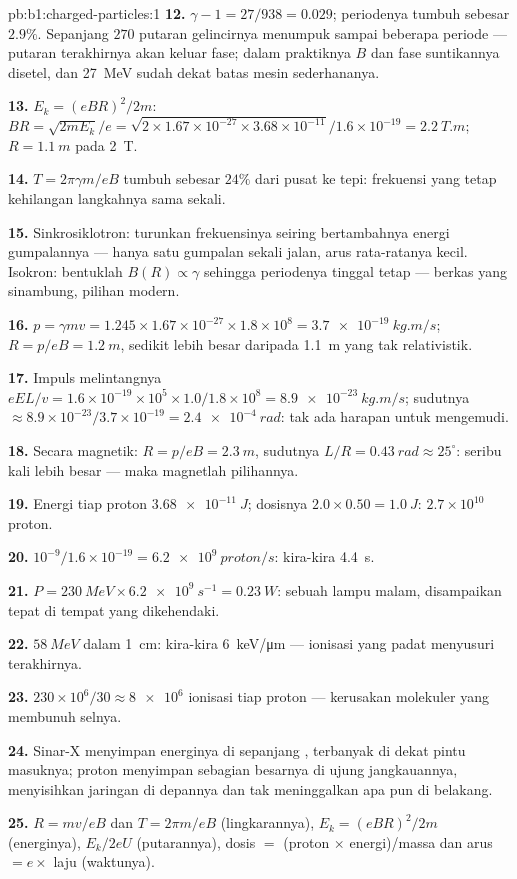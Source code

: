 \begin{solution}{pb:b1:charged-particles:1}
\textbf{12.} $\gamma - 1 = 27/938 = 0.029$; periodenya tumbuh sebesar $2.9\%$.
Sepanjang $270$ putaran gelincirnya menumpuk sampai beberapa periode ---
putaran terakhirnya akan keluar fase; dalam praktiknya $B$ dan fase
suntikannya disetel, dan \qty{27}{MeV} sudah dekat batas mesin sederhananya.

\textbf{13.} $E_k = (eBR)^2/2m$: $BR = \sqrt{2mE_k}/e = \sqrt{2 \times 1.67\times
10^{-27} \times 3.68\times10^{-11}}/1.6\times10^{-19} = \qty{2.2}{T.m}$; $R =
\qty{1.1}{m}$ pada \qty{2}{T}.

\textbf{14.} $T = 2\pi\gamma m/eB$ tumbuh sebesar $24\%$ dari pusat ke tepi:
frekuensi yang tetap kehilangan langkahnya sama sekali.

\textbf{15.} Sinkrosiklotron: turunkan frekuensinya seiring bertambahnya
energi gumpalannya --- hanya satu gumpalan sekali jalan, arus rata-ratanya
kecil. Isokron: bentuklah $B(R) \propto \gamma$ sehingga periodenya tinggal
tetap --- berkas yang sinambung, pilihan modern.

\textbf{16.} $p = \gamma mv = 1.245 \times 1.67\times10^{-27} \times 1.8\times10^8
= \qty{3.7e-19}{kg.m/s}$; $R = p/eB = \qty{1.2}{m}$, sedikit lebih besar daripada
\qty{1.1}{m} yang tak relativistik.

\textbf{17.} Impuls melintangnya $eEL/v = 1.6\times10^{-19} \times 10^5 \times
1.0/1.8\times10^8 = \qty{8.9e-23}{kg.m/s}$; sudutnya $\approx 8.9\times10^{-23}/
3.7\times10^{-19} = \qty{2.4e-4}{rad}$: tak ada harapan untuk mengemudi.

\textbf{18.} Secara magnetik: $R = p/eB = \qty{2.3}{m}$, sudutnya $L/R = \qty{0.43}{rad}
\approx 25^\circ$: seribu kali lebih besar --- maka magnetlah pilihannya.

\textbf{19.} Energi tiap proton $\qty{3.68e-11}{J}$; dosisnya $2.0 \times 0.50 =
\qty{1.0}{J}$: $2.7\times10^{10}$ proton.

\textbf{20.} $10^{-9}/1.6\times10^{-19} = \qty{6.2e9}{proton/s}$: kira-kira
\qty{4.4}{s}.

\textbf{21.} $P = \qty{230}{MeV} \times \qty{6.2e9}{s^{-1}} = \qty{0.23}{W}$:
sebuah lampu malam, disampaikan tepat di tempat yang dikehendaki.

\textbf{22.} $\qty{58}{MeV}$ dalam \qty{1}{cm}: kira-kira \qty{6}{keV/\micro m} ---
ionisasi yang padat menyusuri  terakhirnya.

\textbf{23.} $230\times10^6/30 \approx \num{8e6}$ ionisasi tiap proton ---
kerusakan molekuler yang membunuh selnya.

\textbf{24.} Sinar-X menyimpan energinya di sepanjang , terbanyak
di dekat pintu masuknya; proton menyimpan sebagian besarnya di ujung
jangkauannya, menyisihkan jaringan di depannya dan tak meninggalkan apa pun di belakang.

\textbf{25.} $R = mv/eB$ dan $T = 2\pi m/eB$ (lingkarannya), $E_k = (eBR)^2/2m$
(energinya), $E_k/2eU$ (putarannya), dosis $=$ (proton $\times$ energi)/massa
dan arus $= e \times$ laju (waktunya).
\end{solution}
